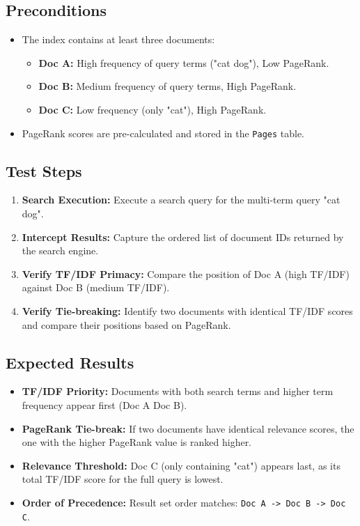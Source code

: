 \documentclass{article}
\begin{document}
\subsection*{Preconditions}
\begin{itemize}
  \item The index contains at least three documents:
  \begin{itemize}
    \item \textbf{Doc A:} High frequency of query terms ("cat dog"), Low PageRank.
    \item \textbf{Doc B:} Medium frequency of query terms, High PageRank.
    \item \textbf{Doc C:} Low frequency (only "cat"), High PageRank.
  \end{itemize}
  \item PageRank scores are pre-calculated and stored in the \texttt{Pages} table.
\end{itemize}

\subsection*{Test Steps}
\begin{enumerate}
  \item \textbf{Search Execution:} Execute a search query for the multi-term query "cat dog".
  \item \textbf{Intercept Results:} Capture the ordered list of document IDs returned by the search engine.
  \item \textbf{Verify TF/IDF Primacy:} Compare the position of Doc A (high TF/IDF) against Doc B (medium TF/IDF).
  \item \textbf{Verify Tie-breaking:} Identify two documents with identical TF/IDF scores and compare their positions based on PageRank.
\end{enumerate}

\subsection*{Expected Results}
\begin{itemize}
  \item \textbf{TF/IDF Priority:} Documents with both search terms and higher term frequency appear first (Doc A 
  Doc B).
  \item \textbf{PageRank Tie-break:} If two documents have identical relevance scores, the one with the higher PageRank value is ranked higher.
  \item \textbf{Relevance Threshold:} Doc C (only containing "cat") appears last, as its total TF/IDF score for the full query is lowest.
  \item \textbf{Order of Precedence:} Result set order matches: \texttt{Doc A -> Doc B -> Doc C}.
\end{itemize}
\end{document}
